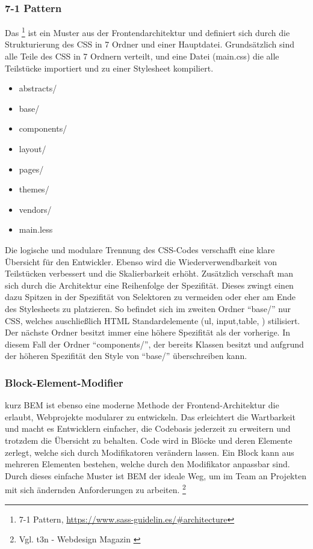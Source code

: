 \subsubsection{7-1 Pattern}
\label{sec:7-1}
Das 
\footnote{7-1 Pattern, \url{https://www.sass-guidelin.es/#architecture}} ist ein
Muster aus der Frontendarchitektur und definiert sich durch die Strukturierung des \ac{CSS} in 7 Ordner und
einer Hauptdatei. Grundsätzlich sind alle Teile des \ac{CSS} in 7 Ordnern
verteilt, und eine Datei (main.css) die alle Teilstücke importiert und zu einer Stylesheet kompiliert.
\begin{multicols}{4}
\begin{itemize}
\item abstracts/
\item base/
\item components/
\item layout/
\item pages/
\item themes/
\item vendors/
\item main.less
\end{itemize}
\end{multicols}
Die logische und modulare Trennung des \ac{CSS}-Codes verschafft eine klare
Übersicht für den Entwickler. Ebenso wird die Wiederverwendbarkeit von
Teilstücken verbessert und die Skalierbarkeit erhöht. Zusätzlich verschaft man
sich durch die Architektur eine Reihenfolge der Spezifität. Dieses zwingt einen
dazu Spitzen in der Spezifität von Selektoren zu vermeiden oder eher
am Ende des Stylesheets zu platzieren. So befindet sich im zweiten Ordner
"`base/"' nur \ac{CSS}, welches auschließlich HTML Standardelemente (\zB ul,
input,table, \usw) stilisiert. Der nächste Ordner besitzt immer eine höhere
Spezifität als der vorherige. In diesem Fall der Ordner "`components/"', der
bereits Klassen besitzt und aufgrund der höheren Spezifität den Style von
"`base/"' überschreiben kann.

\subsubsection{Block-Element-Modifier}
\label{sec:BEM}
 kurz \acs{BEM} ist ebenso eine moderne
Methode der Frontend-Architektur die erlaubt, Webprojekte modularer zu entwickeln.
Das erleichtert die Wartbarkeit und macht es Entwicklern einfacher, die
Codebasis jederzeit zu erweitern und trotzdem die Übersicht zu behalten.
Code wird in Blöcke und deren Elemente zerlegt, welche sich durch Modifikatoren
verändern lassen. Ein Block kann aus mehreren Elementen bestehen, welche durch
den Modifikator anpassbar sind. Durch dieses einfache Muster ist BEM der ideale
Weg, um im Team an Projekten mit sich ändernden Anforderungen zu arbeiten.
 \footnote{Vgl. t3n - Webdesign Magazin \cite{BEM}}
 
